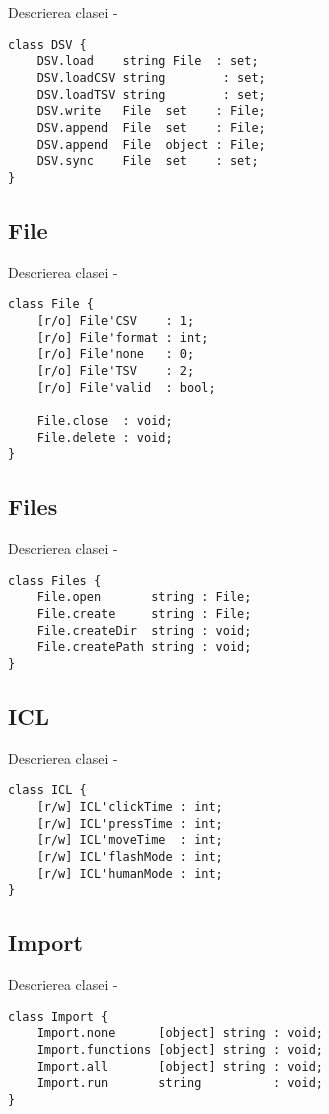 \noindent Descrierea clasei  -
\begin{lstlisting}[numbers=none]
class DSV {
	DSV.load    string File  : set;
	DSV.loadCSV string        : set;
	DSV.loadTSV string        : set;
	DSV.write   File  set    : File;
	DSV.append  File  set    : File;
	DSV.append  File  object : File;
	DSV.sync    File  set    : set;
}
\end{lstlisting}

\subsection{{\color{orange} File}}

\noindent Descrierea clasei  -
\begin{lstlisting}[numbers=none]
class File {
	[r/o] File'CSV    : 1;
	[r/o] File'format : int;
	[r/o] File'none   : 0;
	[r/o] File'TSV    : 2;
	[r/o] File'valid  : bool;
	
	File.close  : void;
	File.delete : void;
}
\end{lstlisting}

\subsection{{\color{orange} Files}}

\noindent Descrierea clasei  -
\begin{lstlisting}[numbers=none]
class Files {
	File.open       string : File;
	File.create     string : File;
	File.createDir  string : void;
	File.createPath string : void;
}
\end{lstlisting}

\subsection{{\color{orange} ICL}}

\noindent Descrierea clasei  -
\begin{lstlisting}[numbers=none]
class ICL {
	[r/w] ICL'clickTime : int;
	[r/w] ICL'pressTime : int;
	[r/w] ICL'moveTime  : int;
	[r/w] ICL'flashMode : int;
	[r/w] ICL'humanMode : int;
}
\end{lstlisting}

\subsection{{\color{orange} Import}}

\noindent Descrierea clasei  -
\begin{lstlisting}[numbers=none]
class Import {
	Import.none      [object] string : void;
	Import.functions [object] string : void;
	Import.all       [object] string : void;
	Import.run       string          : void;
}
\end{lstlisting}

